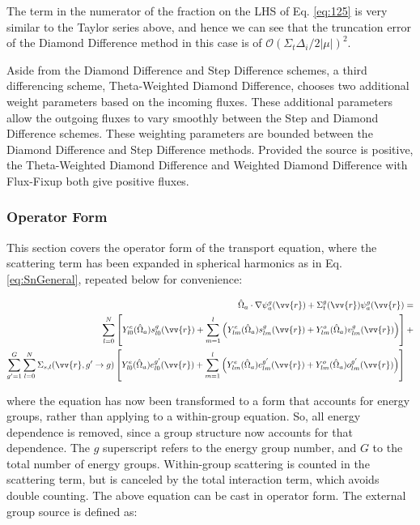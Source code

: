 \documentclass[10pt]{article}
\begin{document}
\begin{flushleft}
\begin{tcolorbox}[breakable]
The term in the numerator of the fraction on the LHS of Eq. \eqref{eq:125} is very similar to the Taylor series above, and hence we can see that the truncation error of the Diamond Difference method in this case is of \(\mathscr{O}(\Sigma_t\Delta_i/2|\mu|)^2\). 
\end{tcolorbox}

Aside from the Diamond Difference and Step Difference schemes, a third differencing scheme, Theta-Weighted Diamond Difference, chooses two additional weight parameters based on the incoming fluxes. These additional parameters allow the outgoing fluxes to vary smoothly between the Step and Diamond Difference schemes. These weighting parameters are bounded between the Diamond Difference and Step Difference methods. Provided the source is positive, the Theta-Weighted Diamond Difference and Weighted Diamond Difference with Flux-Fixup both give positive fluxes.

\subsubsection{Operator Form}

This section covers the operator form of the transport equation, where the scattering term has been expanded in spherical harmonics as in Eq. \eqref{eq:SnGeneral}, repeated below for convenience:

\begin{equation}
\label{eq:StartofOperatorForm}
\begin{aligned}
 \hat{\Omega}_a\cdot\nabla\psi_a^g(\vv{r}) + 
 \Sigma_t^g(\vv{r})\psi_a^g(\vv{r}) = \\
\sum_{l=0}^{N}\left\lbrack Y_{l0}^e(\hat{\Omega}_a)s_{l0}^g(\vv{r})+\sum_{m=1}^{l}\left(Y_{lm}^e(\hat{\Omega}_a)s_{lm}^g(\vv{r})+Y_{lm}^o(\hat{\Omega}_a)v_{lm}^g(\vv{r})\right)\right\rbrack+\\
\sum_{g'=1}^G\sum_{l=0}^{N}\Sigma_{s,l}(\vv{r}, g'\rightarrow g)\left\lbrack Y_{l0}^e(\hat{\Omega}_a)e_{l0}^{g'}(\vv{r})+\sum_{m=1}^{l}\left(Y_{lm}^e(\hat{\Omega}_a)e_{lm}^{g'}(\vv{r})+Y_{lm}^o(\hat{\Omega}_a)o_{lm}^{g'}(\vv{r})\right)\right\rbrack\quad\\
\end{aligned}
\end{equation}

where the equation has now been transformed to a form that accounts for energy groups, rather than applying to a within-group equation. So, all energy dependence is removed, since a group structure now accounts for that dependence. The \(g\) superscript refers to the energy group number, and \(G\) to the total number of energy groups. Within-group scattering is counted in the scattering term, but is canceled by the total interaction term, which avoids double counting. The above equation can be cast in operator form. The external group source is defined as:


\end{flushleft}
\end{document}
